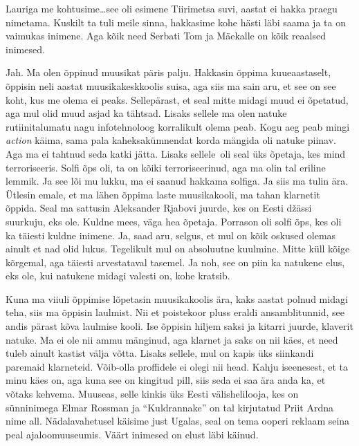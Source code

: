 Lauriga me kohtusime\ldots see oli esimene Tiirimetsa suvi, aastat ei hakka 
praegu nimetama. Kuskilt ta tuli meile sinna, hakkasime kohe hästi läbi saama 
ja ta on vaimukas inimene. Aga kõik need Serbati Tom ja 
Mäekalle  on kõik reaalsed 
inimesed.


Jah. Ma olen õppinud muusikat päris palju. Hakkasin õppima kuueaastaselt, 
õppisin neli aastat muusikakeskkoolis suisa, 
aga siis ma sain aru, et see on see koht, kus me olema ei peaks. Sellepärast, 
et seal mitte midagi muud ei õpetatud, aga mul olid muud asjad ka tähtsad. 
Lisaks sellele ma olen natuke rutiinitalumatu nagu infotehnoloog korralikult 
olema peab. Kogu aeg peab mingi \emph{action} käima, sama pala kaheksakümnendat 
korda mängida oli natuke piinav. Aga ma ei  tahtnud seda katki jätta.  Lisaks 
sellele oli seal üks õpetaja, kes mind terroriseeris. Solfi õps oli, ta on 
kõiki terroriseerinud, aga ma olin tal eriline lemmik. Ja see lõi mu lukku, ma 
ei saanud hakkama solfiga. Ja siis ma tulin ära. Ütlesin emale, et ma lähen 
õppima laste muusikakooli, ma tahan klarnetit 
õppida. Seal ma sattusin Aleksander Rjabovi 
juurde, kes on Eesti džässi suurkuju, eks ole. Kuldne mees, väga hea õpetaja. 
Porrason oli solfi õps, kes oli ka täiesti  kuldne inimene. Ja, saad aru, 
selgus, et mul on kõik oskused olemas ainult et nad olid lukus. Tegelikult mul 
on absoluutne kuulmine. Mitte küll  kõige kõrgemal, aga täiesti arvestataval 
tasemel. Ja noh, see on piin ka natukene elus, eks ole, kui natukene midagi 
valesti on, kohe kratsib. 

Kuna ma viiuli  õppimise lõpetasin muusikakoolis ära, kaks aastat polnud midagi 
teha, siis ma õppisin laulmist. Nii et poistekoor pluss eraldi ansamblitunnid, 
see andis pärast kõva laulmise kooli. Ise õppisin hiljem saksi ja kitarri 
juurde, klaverit natuke. Ma ei ole nii ammu mänginud, aga klarnet ja saks on 
nii käes, et need tuleb ainult kastist välja võtta. Lisaks sellele, mul on 
kapis üks siinkandi paremaid klarneteid. Võib-olla proffidele ei olegi nii 
head. Kahju iseenesest, et  ta minu käes on, aga kuna see on kingitud pill, 
siis seda ei saa ära anda ka, et võtaks kehvema. Muuseas, selle kinkis üks 
Eesti välishelilooja, kes on sünninimega Elmar Rossman ja \enquote{Kuldrannake} on tal kirjutatud Priit Ardna nime all. Nädalavahetusel käisime just Ugalas, seal 
on tema ooperi reklaam seina peal ajaloomuuseumis. Väärt inimesed on elust läbi 
käinud. 

